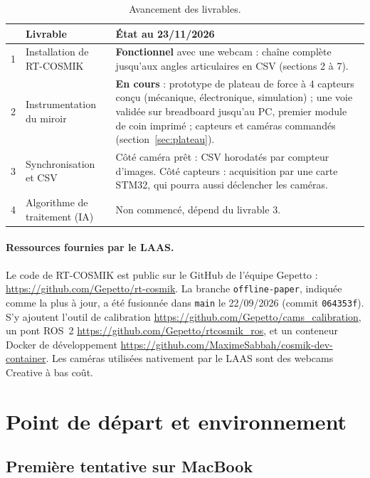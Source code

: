 \documentclass[11pt,a4paper]{article}
\newcommand{\code}[1]{\texttt{\small #1}}
\begin{document}
\begin{table}[H]
\centering
\begin{tabular}{@{}clp{8.2cm}@{}}
\toprule
& \textbf{Livrable} & \textbf{État au 23/11/2026} \\
\midrule
1 & Installation de RT-COSMIK & \textcolor{vert}{\textbf{Fonctionnel}} avec une webcam : chaîne complète jusqu'aux angles articulaires en CSV (sections 2 à 7). \\
2 & Instrumentation du miroir & \textbf{En cours} : prototype de plateau de force à 4 capteurs conçu (mécanique, électronique, simulation) ; une voie validée sur breadboard jusqu'au PC, premier module de coin imprimé ; capteurs et caméras commandés (section~\ref{sec:plateau}). \\
3 & Synchronisation et CSV & Côté caméra prêt : CSV horodatés par compteur d'images. Côté capteurs : acquisition par une carte STM32, qui pourra aussi déclencher les caméras. \\
4 & Algorithme de traitement (IA) & Non commencé, dépend du livrable 3. \\
\bottomrule
\end{tabular}
\caption{Avancement des livrables.}
\end{table}

\paragraph{Ressources fournies par le LAAS.}
Le code de RT-COSMIK est public sur le GitHub de l'équipe Gepetto : \url{https://github.com/Gepetto/rt-cosmik}. La branche \code{offline-paper}, indiquée comme la plus à jour, a été fusionnée dans \code{main} le 22/09/2026 (commit \code{064353f}). S'y ajoutent l'outil de calibration \url{https://github.com/Gepetto/cams_calibration}, un pont ROS~2 \url{https://github.com/Gepetto/rtcosmik_ros}, et un conteneur Docker de développement \url{https://github.com/MaximeSabbah/cosmik-dev-container}. Les caméras utilisées nativement par le LAAS sont des webcams Creative à bas coût.

\section{Point de départ et environnement}

\subsection{Première tentative sur MacBook}
\end{document}
